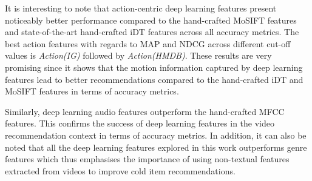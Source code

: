 \documentclass[review]{elsarticle}
\begin{document}
It is interesting to note that action-centric deep learning features present noticeably better performance compared to the hand-crafted MoSIFT features and state-of-the-art hand-crafted iDT features across all accuracy metrics. The best action features with regards to MAP and NDCG across different cut-off values is \textit{Action(IG)} followed by \textit{Action(HMDB)}. These results are very promising since it shows that the motion information captured by deep learning features lead to better recommendations compared to the hand-crafted iDT and MoSIFT features in terms of accuracy metrics. 

Similarly, deep learning audio features outperform the hand-crafted MFCC features. This confirms the success of deep learning features in the video recommendation context in terms of accuracy metrics. In addition, it can also be noted that all the deep learning features explored in this work outperforms genre features which thus emphasises the importance of using non-textual features extracted from videos to improve cold item recommendations. 
\end{document}
